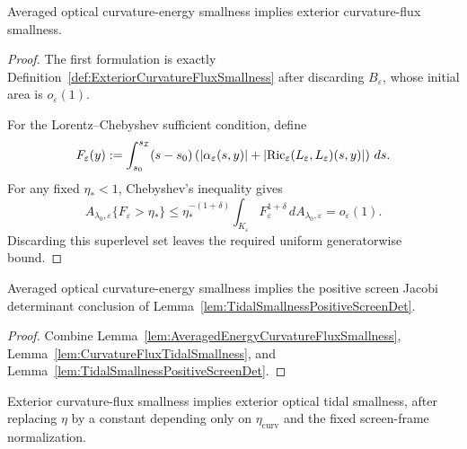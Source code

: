 \begin{lemma}\label{lem:AveragedEnergyCurvatureFluxSmallness}
Averaged optical curvature-energy smallness implies exterior curvature-flux smallness.
\end{lemma}

\begin{proof}
The first formulation is exactly Definition~\ref{def:ExteriorCurvatureFluxSmallness} after discarding $B_\varepsilon$, whose initial area is $o_\varepsilon(1)$.

For the Lorentz--Chebyshev sufficient condition, define
\[
    F_\varepsilon(y)
    :=
    \int_{s_0}^{s_{\mathcal{I}}}
    (s-s_0)
    \left(
        |\alpha_\varepsilon(s,y)|
        +|\mathrm{Ric}_\varepsilon(L_\varepsilon,L_\varepsilon)(s,y)|
    \right)\,ds .
\]
For any fixed $\eta_*<1$, Chebyshev's inequality gives
\[
    A_{\lambda_0,\varepsilon}\{F_\varepsilon>\eta_*\}
    \le
    \eta_*^{-(1+\delta)}
    \int_{K_\varepsilon}F_\varepsilon^{1+\delta}\,dA_{\lambda_0,\varepsilon}
    =
    o_\varepsilon(1).
\]
Discarding this superlevel set leaves the required uniform generatorwise bound.
\end{proof}

\begin{corollary}\label{cor:AveragedEnergyPositiveScreenDet}
Averaged optical curvature-energy smallness implies the positive screen Jacobi determinant conclusion of Lemma~\ref{lem:TidalSmallnessPositiveScreenDet}.
\end{corollary}

\begin{proof}
Combine Lemma~\ref{lem:AveragedEnergyCurvatureFluxSmallness}, Lemma~\ref{lem:CurvatureFluxTidalSmallness}, and Lemma~\ref{lem:TidalSmallnessPositiveScreenDet}.
\end{proof}

\begin{lemma}\label{lem:CurvatureFluxTidalSmallness}
Exterior curvature-flux smallness implies exterior optical tidal smallness, after replacing $\eta$ by a constant depending only on $\eta_{\mathrm{curv}}$ and the fixed screen-frame normalization.
\end{lemma}

